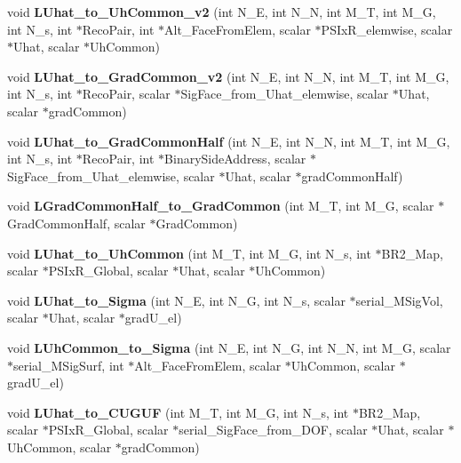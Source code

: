 \begin{DoxyCompactItemize}
\item 
void {\bf L\-Uhat\-\_\-to\-\_\-\-Uh\-Common\-\_\-v2} (int N\-\_\-\-E, int N\-\_\-\-N, int M\-\_\-\-T, int M\-\_\-\-G, int N\-\_\-s, int $\ast$Reco\-Pair, int $\ast$Alt\-\_\-\-Face\-From\-Elem, scalar $\ast$P\-S\-Ix\-R\-\_\-elemwise, scalar $\ast$Uhat, scalar $\ast$Uh\-Common)
\item 
void {\bf L\-Uhat\-\_\-to\-\_\-\-Grad\-Common\-\_\-v2} (int N\-\_\-\-E, int N\-\_\-\-N, int M\-\_\-\-T, int M\-\_\-\-G, int N\-\_\-s, int $\ast$Reco\-Pair, scalar $\ast$Sig\-Face\-\_\-from\-\_\-\-Uhat\-\_\-elemwise, scalar $\ast$Uhat, scalar $\ast$grad\-Common)
\item 
void {\bfseries L\-Uhat\-\_\-to\-\_\-\-Grad\-Common\-Half} (int N\-\_\-\-E, int N\-\_\-\-N, int M\-\_\-\-T, int M\-\_\-\-G, int N\-\_\-s, int $\ast$Reco\-Pair, int $\ast$Binary\-Side\-Address, scalar $\ast$Sig\-Face\-\_\-from\-\_\-\-Uhat\-\_\-elemwise, scalar $\ast$Uhat, scalar $\ast$grad\-Common\-Half)\label{kernels__phil_8cu_adf9981d9b195371edc280b611c4e1776}

\item 
void {\bfseries L\-Grad\-Common\-Half\-\_\-to\-\_\-\-Grad\-Common} (int M\-\_\-\-T, int M\-\_\-\-G, scalar $\ast$Grad\-Common\-Half, scalar $\ast$Grad\-Common)\label{kernels__phil_8cu_aa927889d75f51b7ba59ea44475c7a244}

\item 
void {\bf L\-Uhat\-\_\-to\-\_\-\-Uh\-Common} (int M\-\_\-\-T, int M\-\_\-\-G, int N\-\_\-s, int $\ast$B\-R2\-\_\-\-Map, scalar $\ast$P\-S\-Ix\-R\-\_\-\-Global, scalar $\ast$Uhat, scalar $\ast$Uh\-Common)
\item 
void {\bfseries L\-Uhat\-\_\-to\-\_\-\-Sigma} (int N\-\_\-\-E, int N\-\_\-\-G, int N\-\_\-s, scalar $\ast$serial\-\_\-\-M\-Sig\-Vol, scalar $\ast$Uhat, scalar $\ast$grad\-U\-\_\-el)\label{kernels__phil_8cu_a61970ad2a89a81b97877b77341569082}

\item 
void {\bfseries L\-Uh\-Common\-\_\-to\-\_\-\-Sigma} (int N\-\_\-\-E, int N\-\_\-\-G, int N\-\_\-\-N, int M\-\_\-\-G, scalar $\ast$serial\-\_\-\-M\-Sig\-Surf, int $\ast$Alt\-\_\-\-Face\-From\-Elem, scalar $\ast$Uh\-Common, scalar $\ast$grad\-U\-\_\-el)\label{kernels__phil_8cu_af700e16a3bc2a086de1ec01aa66f0059}

\item 
void {\bf L\-Uhat\-\_\-to\-\_\-\-C\-U\-G\-U\-F} (int M\-\_\-\-T, int M\-\_\-\-G, int N\-\_\-s, int $\ast$B\-R2\-\_\-\-Map, scalar $\ast$P\-S\-Ix\-R\-\_\-\-Global, scalar $\ast$serial\-\_\-\-Sig\-Face\-\_\-from\-\_\-\-D\-O\-F, scalar $\ast$Uhat, scalar $\ast$Uh\-Common, scalar $\ast$grad\-Common)
\end{DoxyCompactItemize}


